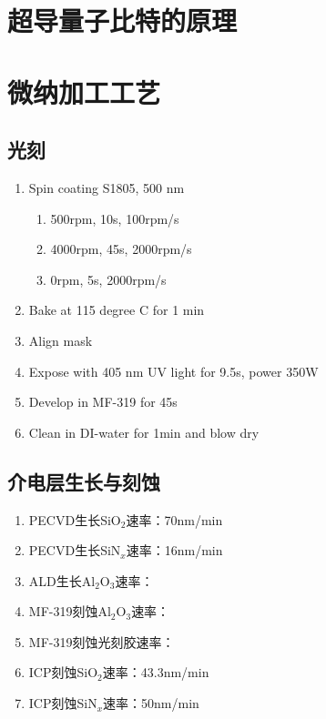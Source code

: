 
\chapter{超导量子比特的原理} %
\label{cha:SCQubitPrinciple}
  













\chapter{微纳加工工艺} %
\label{cha:fabrication}

\section{光刻} %
\label{sec:光刻}
    \begin{enumerate}
        \item Spin coating S1805, 500 nm
        \begin{enumerate}
            \item 500rpm, 10s, 100rpm/s
            \item 4000rpm, 45s, 2000rpm/s
            \item 0rpm, 5s, 2000rpm/s
        \end{enumerate}
        \item Bake at 115 degree C for 1 min
        \item Align mask
        \item Expose with 405 nm UV light for 9.5s, power 350W
        \item Develop in MF-319 for 45s
        \item Clean in DI-water for 1min and blow dry
    \end{enumerate}

\section{介电层生长与刻蚀} %
\label{sec:介电层生长与刻蚀}
    \begin{enumerate}
        \item PECVD生长SiO$_2$速率：70nm/min
        \item PECVD生长SiN$_x$速率：16nm/min
        \item ALD生长Al$_2$O$_3$速率：
        \item MF-319刻蚀Al$_2$O$_3$速率：
        \item MF-319刻蚀光刻胶速率：
        \item ICP刻蚀SiO$_2$速率：43.3nm/min
        \item ICP刻蚀SiN$_x$速率：50nm/min
    \end{enumerate}
